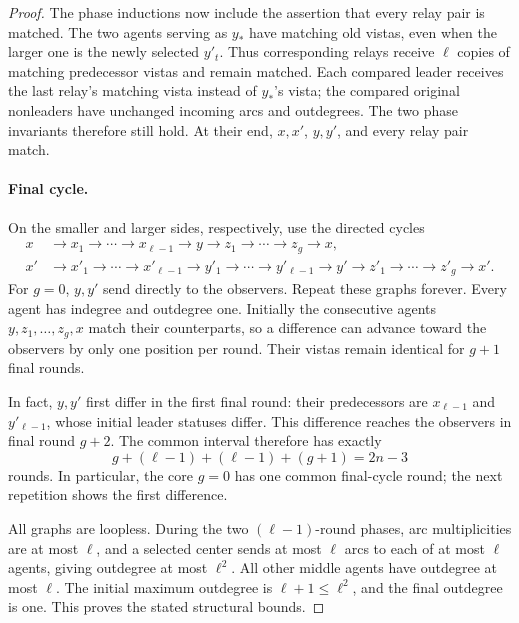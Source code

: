 \documentclass[11pt]{article}
\begin{document}
\begin{proof}
The phase inductions now include the assertion that every relay pair is
matched. The two agents serving as \(y_*\) have matching old vistas, even
when the larger one is the newly selected \(y'_t\). Thus corresponding
relays receive \(\ell\) copies of matching predecessor vistas and remain
matched. Each compared leader receives the last relay's matching vista
instead of \(y_*\)'s vista; the compared original nonleaders have unchanged
incoming arcs and outdegrees. The two phase invariants therefore still
hold. At their end, \(x,x'\), \(y,y'\), and every relay pair match.

\paragraph{Final cycle.}
On the smaller and larger sides, respectively, use the directed cycles
\[
\begin{aligned}
 x&\to x_1\to\cdots\to x_{\ell-1}\to y
       \to z_1\to\cdots\to z_g\to x,\\
 x'&\to x'_1\to\cdots\to x'_{\ell-1}
       \to y'_1\to\cdots\to y'_{\ell-1}\to y'
       \to z'_1\to\cdots\to z'_g\to x'.
\end{aligned}
\]
For \(g=0\), \(y,y'\) send directly to the observers.
Repeat these graphs forever. Every agent has indegree and outdegree one.
Initially the consecutive agents \(y,z_1,\ldots,z_g,x\) match their
counterparts, so a difference can advance toward the observers by only
one position per round. Their vistas remain identical for \(g+1\)
final rounds.

In fact, \(y,y'\) first differ in the first final round: their predecessors
are \(x_{\ell-1}\) and \(y'_{\ell-1}\), whose initial leader statuses differ.
This difference reaches the observers in final round \(g+2\).
The common interval therefore has exactly
\[
 g+(\ell-1)+(\ell-1)+(g+1)=2n-3
\]
rounds. In particular, the core \(g=0\) has one common final-cycle round;
the next repetition shows the first difference.

All graphs are loopless. During the two \((\ell-1)\)-round phases, arc multiplicities
are at most \(\ell\), and a selected center sends at most \(\ell\) arcs to each of at most
\(\ell\) agents, giving outdegree at most \(\ell^2\).
All other middle agents have outdegree at most \(\ell\).
The initial maximum outdegree is \(\ell+1\le\ell^2\), and the final
outdegree is one. This proves the stated structural bounds.
\end{proof}
\end{document}
